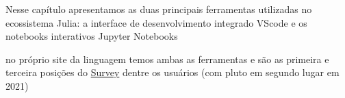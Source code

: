 %

Nesse capítulo apresentamos as duas principais ferramentas utilizadas no ecossistema Julia: a interface de desenvolvimento integrado VScode e os notebooks interativos Jupyter Notebooks %

no próprio site da linguagem temos ambas as ferramentas e são as primeira e terceira posições do \href{https://julialang.org/blog/2021/08/julia-user-developer-survey/}{Survey} dentre os usuários (com pluto em segundo lugar em 2021)
